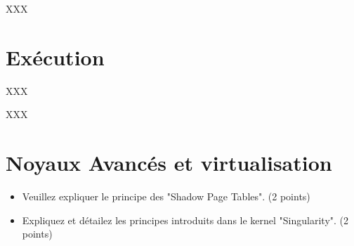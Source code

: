 \begin{correction}

XXX

\end{correction}

%
%

\section{Ex\'ecution
         {\hfill{} }}

XXX

\begin{correction}

XXX

\end{correction}

%
%

\section{Noyaux Avanc\'es et virtualisation
         }


\begin{itemize}
    \item
        Veuillez expliquer le principe des "Shadow Page Tables". (2 points)
    \item
        Expliquez et d\'etailez les principes introduits dans le kernel "Singularity". (2 points)
\end{itemize}




